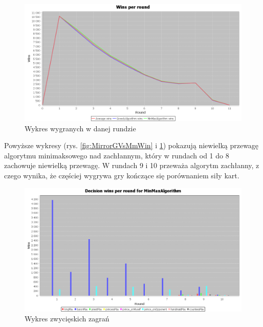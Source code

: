 \begin{figure}[H]
	\centering
	\includegraphics[width=\textwidth]{Resources/MirrorMmVsG/GVsMmRoundWin.PNG}
	\caption{Wykres wygranych w danej rundzie} 
	\label{fig:MirrorGVsMmRoundWin}
\end{figure}

Powyższe wykresy (rys. \ref{fig:MirrorGVsMmWin} i \ref{fig:MirrorGVsMmRoundWin}) pokazują niewielką przewagę algorytmu minimaksowego nad zachłannym, który w rundach od 1 do 8 zachowuje niewielką przewagę. W rundach 9 i 10 przeważa algorytm zachłanny, z czego wynika, że częściej wygrywa gry kończące się porównaniem siły kart.

\begin{figure}[H]
	\centering
	\includegraphics[width=\textwidth]{Resources/MirrorMmVsG/MmVsGDecision.PNG}
	\caption{Wykres zwycięskich zagrań} 
	\label{fig:MirrorMmVsGDecision}
\end{figure} 

